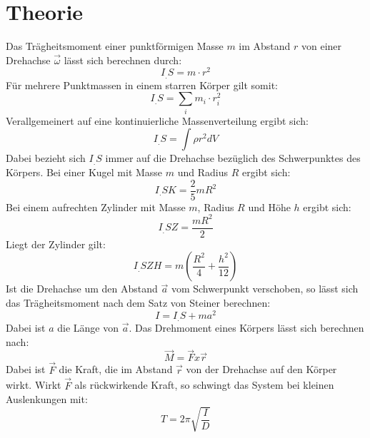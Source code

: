 
\section{Theorie}
\label{sec:Theorie}

Das Trägheitsmoment einer punktförmigen Masse $m$ im Abstand $r$ von einer Drehachse $\vec{\omega}$ lässt sich berechnen durch:
\begin{equation}
I_.S = m\cdot r^2 
\end{equation}
Für mehrere Punktmassen in einem starren Körper gilt somit:
\begin{equation}
I_.S = \sum_i m_i\cdot r_i^2\label{eq:I_S}
\end{equation}
Verallgemeinert auf eine kontinuierliche Massenverteilung ergibt sich:
\begin{equation}
I_.S = \int \rho r^2 dV \label{eq:I_S2}
\end{equation}
Dabei bezieht sich $I_.S$ immer auf die Drehachse bezüglich des Schwerpunktes des Körpers.\newline  
Bei einer Kugel mit Masse $m$ und Radius $R$ ergibt sich:
\begin{equation}
I_.{SK} = \frac{2}{5}mR^2 \label{eq:I_SK}
\end{equation}
Bei einem aufrechten Zylinder mit Masse $m$, Radius $R$ und Höhe $h$ ergibt sich:
\begin{equation}
I_.{SZ} = \frac{mR^2}{2} \label{eq:I_SZ}
\end{equation}
Liegt der Zylinder gilt:
\begin{equation}
I_.{SZH} = m\left(\frac{R^2}{4}+\frac{h^2}{12}\right) \label{eq:I_SZH}
\end{equation}
Ist die Drehachse um den Abstand $\vec{a}$ vom Schwerpunkt verschoben, so lässt sich das Trägheitsmoment nach dem Satz von Steiner berechnen:
\begin{equation}
I = I_.S+m a^2 \label{eq:Satz von Steiner}
\end{equation}
Dabei ist $a$ die Länge von $\vec{a}$. Das Drehmoment eines Körpers lässt sich berechnen nach:
\begin{equation}
\vec{M} = \vec{F}x\vec{r} \label{eq;M}
\end{equation}
Dabei ist $\vec{F}$ die Kraft, die im Abstand $\vec{r}$ von der Drehachse auf den Körper wirkt. Wirkt $\vec{F}$ als rückwirkende Kraft, so schwingt das System bei kleinen Auslenkungen mit:
\begin{equation}
T = 2\pi\sqrt{\frac{I}{D}} \label{eq:T}
\end{equation}
